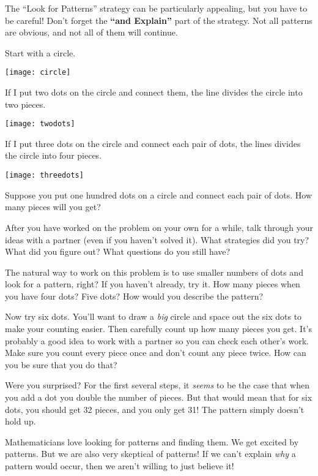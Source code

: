 The ``Look for Patterns'' strategy can be particularly appealing, but you have to be careful!  Don't forget the {\bf ``and Explain''} part of the strategy.  Not all patterns are obvious, and not all of them will continue.

\begin{problem}
Start with a circle.  
\begin{center}
\texttt{[image: circle]}
\end{center}
If I put two dots on the circle and connect them, the line divides the circle into two pieces.
\begin{center}
\texttt{[image: twodots]}
\end{center}
If I put three dots on the circle and connect each pair of dots, the lines divides the circle into four pieces.
\begin{center}
\texttt{[image: threedots]}
\end{center}
Suppose you put one hundred dots on a circle and connect each pair of dots.  How many pieces will you get? 
\end{problem}

\begin{thinkpair*}
After you have worked on the problem on your own for a while, talk through your ideas with a partner (even if you haven't solved it).  What strategies did you try?   What did you figure out?  What questions do you still have?
\end{thinkpair*}


The natural way to work on this problem is to use smaller numbers of dots and look for a pattern, right?  If you haven't already, try it.  How many pieces when you have four dots?  Five dots?   How would you describe the pattern?

Now try six dots.  You'll want to draw a \emph{big} circle and space out the six dots to make your counting easier.  Then carefully count up how many pieces you get.  It's probably a good idea to work with a partner so you can check each other's work.  Make sure you count every piece once and don't count any piece twice.  How can you be sure that you do that?

Were you surprised?  For the first several steps, it  \emph{seems} to be the case that when you add a dot you double the number of pieces.  But that would mean that for six dots, you should get 32 pieces, and you only get 31!  The pattern simply doesn't hold up.


Mathematicians love looking for patterns and finding them.  We get excited by patterns.   But we are also very skeptical of patterns!  If we can't explain \emph{why} a pattern would occur, then we aren't willing to just believe it!  

